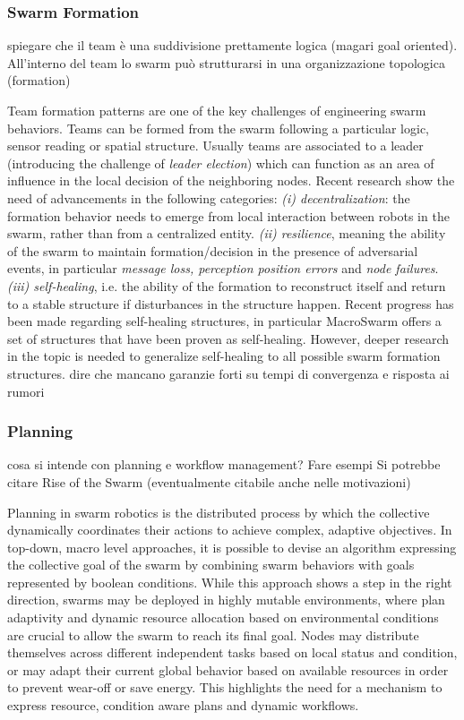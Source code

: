 \documentclass[12pt]{article}
\begin{document}
\subsubsection{Swarm Formation}
spiegare che il team è una suddivisione prettamente logica (magari goal oriented).
All'interno del team lo swarm può strutturarsi in una organizzazione topologica (formation)

Team formation patterns are one of the key challenges of engineering swarm behaviors. 
Teams can be formed from the swarm following a particular logic, sensor reading or spatial structure. Usually teams 
are associated to a leader (introducing the challenge of \textit{leader election}) which can function as an area of influence in the
local decision of the neighboring nodes. Recent research show the need of advancements in the following categories:
\textit{(i) decentralization}: the formation behavior needs to emerge from local interaction between robots in the swarm, rather than from a centralized entity. 
\textit{(ii) resilience}, meaning the ability of the swarm to maintain formation/decision
in the presence of adversarial events, in particular \textit{message loss, perception position errors} and \textit{node failures}.
\textit{(iii) self-healing}, i.e. the ability of the formation to reconstruct itself and return to a stable structure if disturbances in the structure happen. Recent progress has been made
regarding self-healing structures, in particular MacroSwarm offers a set of structures that have been proven as self-healing. However, deeper research in the topic is needed to generalize self-healing
to all possible swarm formation structures. dire che mancano garanzie forti su tempi di convergenza e risposta ai rumori

\subsubsection{Planning}
cosa si intende con planning e workflow management? Fare esempi
Si potrebbe citare Rise of the Swarm (eventualmente citabile anche nelle motivazioni)

Planning in swarm robotics is the distributed process by which the collective dynamically coordinates their actions to achieve complex, adaptive objectives.
In top-down, macro level approaches, it is possible to devise an algorithm expressing the collective goal of the swarm by combining swarm behaviors with goals represented by boolean conditions.
While this approach shows a step in the right direction, swarms may be deployed in highly mutable environments, where plan adaptivity and dynamic resource allocation based on environmental conditions
are crucial to allow the swarm to reach its final goal. Nodes may distribute themselves across different independent tasks based on local status and condition, or may adapt their current global behavior
based on available resources in order to prevent wear-off or save energy.
This highlights the need for a mechanism to express resource, condition aware plans and dynamic workflows.
\end{document}
